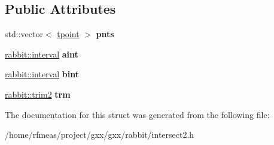 \subsection*{Public Attributes}
\begin{DoxyCompactItemize}
\item 
std\+::vector$<$ \hyperlink{structrabbit_1_1tpoint}{tpoint} $>$ {\bfseries pnts}\hypertarget{structrabbit_1_1trim__trim__intersection__result_a49fe229cffe441ff52a4e1d758bfc942}{}\label{structrabbit_1_1trim__trim__intersection__result_a49fe229cffe441ff52a4e1d758bfc942}

\item 
\hyperlink{classgxx_1_1math_1_1interval}{rabbit\+::interval} {\bfseries aint}\hypertarget{structrabbit_1_1trim__trim__intersection__result_acad89529b259d018ceb877f2314e6b64}{}\label{structrabbit_1_1trim__trim__intersection__result_acad89529b259d018ceb877f2314e6b64}

\item 
\hyperlink{classgxx_1_1math_1_1interval}{rabbit\+::interval} {\bfseries bint}\hypertarget{structrabbit_1_1trim__trim__intersection__result_aab215bdf1ef4c911b5b69f41712ab2fc}{}\label{structrabbit_1_1trim__trim__intersection__result_aab215bdf1ef4c911b5b69f41712ab2fc}

\item 
\hyperlink{structrabbit_1_1trim2}{rabbit\+::trim2} {\bfseries trm}\hypertarget{structrabbit_1_1trim__trim__intersection__result_ad8574d3b23e2011e9f296b6acf97aca1}{}\label{structrabbit_1_1trim__trim__intersection__result_ad8574d3b23e2011e9f296b6acf97aca1}

\end{DoxyCompactItemize}


The documentation for this struct was generated from the following file\+:\begin{DoxyCompactItemize}
\item 
/home/rfmeas/project/gxx/gxx/rabbit/intersect2.\+h\end{DoxyCompactItemize}
